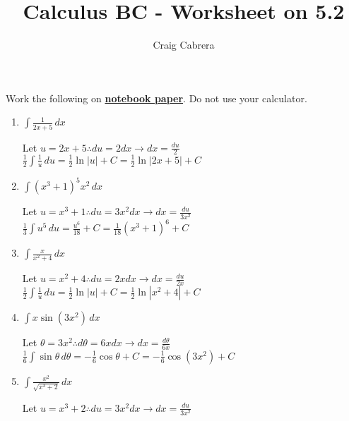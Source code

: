 \documentclass[10pt, letterpaper]{report}
\title{Calculus BC - Worksheet on 5.2}
\author{Craig Cabrera}
\date{}
\begin{document}
\maketitle
Work the following on \textbf{\underline{notebook paper}}. Do not use your calculator.
\begin{enumerate}
  \item{$\int{\frac{1}{2x+5}}\,dx$ \\}

    Let $u=2x+5 \therefore du=2dx\rightarrow dx=\frac{du}{2}$ \\

    $\frac{1}{2}\int{\frac{1}{u}}\,du =
    \frac{1}{2}\ln{|u|}+C = \frac{1}{2}\ln{|2x+5|}+C$ \\

  \item{$\int{\left( x^{3}+1\right)^{5}x^{2}}\,dx$ \\}

    Let $u=x^{3}+1 \therefore du=3x^{2}dx \rightarrow dx=\frac{du}{3x^{2}}$ \\

    $\frac{1}{3}\int{u^{5}}\,du =
    \frac{u^{6}}{18}+C = \frac{1}{18}(x^{3}+1)^{6}+C$ \\

  \item{$\int{\frac{x}{x^{2}+4}}\,dx$ \\}

    Let $u=x^{2}+4\therefore du=2xdx\rightarrow dx=\frac{du}{2x}$ \\

    $\frac{1}{2}\int{\frac{1}{u}}\,du =
    \frac{1}{2}\ln{|u|}+C=\frac{1}{2}\ln{|x^{2}+4|}+C$ \\

  \item{$\int{x\sin{(3x^{2})}}\,dx$ \\}

    Let $\theta=3x^{2}\therefore d\theta=6xdx\rightarrow dx=\frac{d\theta}{6x}$ \\

    $\frac{1}{6}\int{\sin{\theta}}\,d\theta=
    -\frac{1}{6}\cos{\theta}+C=-\frac{1}{6}\cos{(3x^{2})}+C$ \\

  \item{$\int{\frac{x^{2}}{\sqrt{x^{3}+2}}}\,dx$ \\}

    Let $u=x^{3}+2\therefore du=3x^{2}dx\rightarrow dx=\frac{du}{3x^{2}}$ \\


\end{enumerate}
\end{document}
